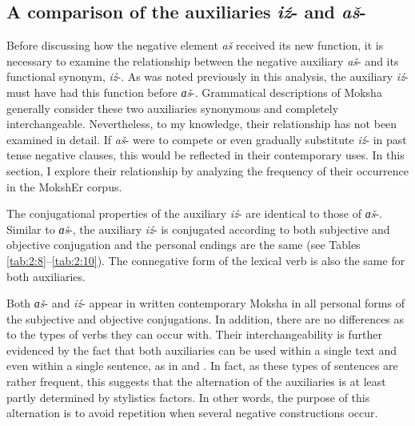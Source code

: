 \documentclass[output=paper]{langsci/langscibook}
\begin{document}
\subsection{A comparison of the auxiliaries \textit{iź}- and \textit{aš}-}\label{sec:2:6.2}

Before discussing how the negative element \textit{aš} received its new function, it is necessary to examine the relationship between the negative auxiliary \textit{aš}- and its functional synonym, \textit{iź}-. As was noted previously in this analysis, the auxiliary \textit{iź}- must have had this function before \textit{ɑš}-. Grammatical descriptions of Moksha generally consider these two auxiliaries synonymous and completely interchangeable. Nevertheless, to my knowledge, their relationship has not been examined in detail. If \textit{aš}- were to compete or even gradually substitute \textit{iź}- in past tense negative clauses, this would be reflected in their contemporary uses. In this section, I explore their relationship by analyzing the frequency of their occurrence in the MokshEr corpus.

  The conjugational properties of the auxiliary \textit{iź}- are identical to those of \textit{ɑš}-. Similar to \textit{ɑš}-, the auxiliary \textit{iź}- is conjugated according to both subjective and objective conjugation and the personal endings are the same (see Tables \ref{tab:2:8}--\ref{tab:2:10}). The connegative form of the lexical verb is also the same for both auxiliaries. 

Both \textit{ɑš}- and \textit{iź}- appear in written contemporary Moksha in all personal forms of the subjective and objective conjugations. In addition, there are no differences as to the types of verbs they can occur with. Their interchangeability is further evidenced by the fact that both auxiliaries can be used within a single text and even within a single sentence, as in  and . In fact, as these types of sentences are rather frequent, this suggests that the alternation of the auxiliaries is at least partly determined by stylistics factors. In other words, the purpose of this alternation is to avoid repetition when several negative constructions occur.
\end{document}
